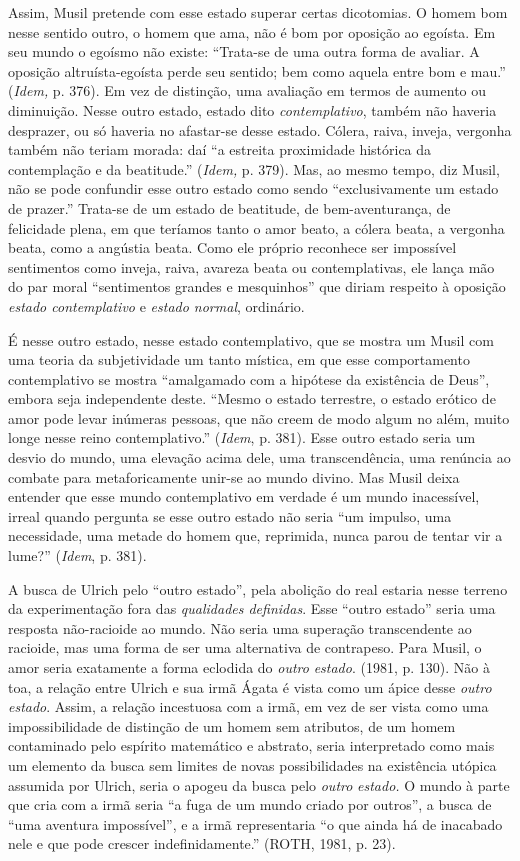 Assim, Musil pretende com esse estado superar certas dicotomias. O homem
bom nesse sentido outro, o homem que ama, não é bom por oposição ao
egoísta. Em seu mundo o egoísmo não existe: ``Trata-se de uma outra
forma de avaliar. A oposição altruísta-egoísta perde seu sentido; bem
como aquela entre bom e mau.'' (\emph{Idem,} p. 376). Em vez de
distinção, uma avaliação em termos de aumento ou diminuição. Nesse outro
estado, estado dito \emph{contemplativo}, também não haveria desprazer,
ou só haveria no afastar-se desse estado. Cólera, raiva, inveja,
vergonha também não teriam morada: daí ``a estreita proximidade
histórica da contemplação e da beatitude.'' (\emph{Idem,} p. 379). Mas,
ao mesmo tempo, diz Musil, não se pode confundir esse outro estado como
sendo ``exclusivamente um estado de prazer.'' Trata-se de um estado de
beatitude, de bem-aventurança, de felicidade plena, em que teríamos
tanto o amor beato, a cólera beata, a vergonha beata, como a angústia
beata. Como ele próprio reconhece ser impossível sentimentos como
inveja, raiva, avareza beata ou contemplativas, ele lança mão do par
moral ``sentimentos grandes e mesquinhos'' que diriam respeito à
oposição \emph{estado contemplativo} e \emph{estado normal}, ordinário.

É nesse outro estado, nesse estado contemplativo, que se mostra um Musil
com uma teoria da subjetividade um tanto mística, em que esse
comportamento contemplativo se mostra ``amalgamado com a hipótese da
existência de Deus'', embora seja independente deste. ``Mesmo o estado
terrestre, o estado erótico de amor pode levar inúmeras pessoas, que não
creem de modo algum no além, muito longe nesse reino contemplativo.''
(\emph{Idem}, p. 381). Esse outro estado seria um desvio do mundo, uma
elevação acima dele, uma transcendência, uma renúncia ao combate para
metaforicamente unir-se ao mundo divino. Mas Musil deixa entender que
esse mundo contemplativo em verdade é um mundo inacessível, irreal
quando pergunta se esse outro estado não seria ``um impulso, uma
necessidade, uma metade do homem que, reprimida, nunca parou de tentar
vir a lume?'' (\emph{Idem}, p. 381).

A busca de Ulrich pelo ``outro estado'', pela abolição do real estaria
nesse terreno da experimentação fora das \emph{qualidades definidas}.
Esse ``outro estado'' seria uma resposta não-racioide ao mundo. Não
seria uma superação transcendente ao racioide, mas uma forma de ser uma
alternativa de contrapeso. Para Musil, o amor seria exatamente a forma
eclodida do \emph{outro} \emph{estado}. (1981, p. 130). Não à toa, a
relação entre Ulrich e sua irmã Ágata é vista como um ápice desse
\emph{outro estado}. Assim, a relação incestuosa com a irmã, em vez de
ser vista como uma impossibilidade de distinção de um homem sem
atributos, de um homem contaminado pelo espírito matemático e abstrato,
seria interpretado como mais um elemento da busca sem limites de novas
possibilidades na existência utópica assumida por Ulrich, seria o apogeu
da busca pelo \emph{outro} \emph{estado.} O mundo à parte que cria com a
irmã seria ``a fuga de um mundo criado por outros'', a busca de ``uma
aventura impossível'', e a irmã representaria ``o que ainda há de
inacabado nele e que pode crescer indefinidamente.'' (ROTH, 1981, p.
23).

